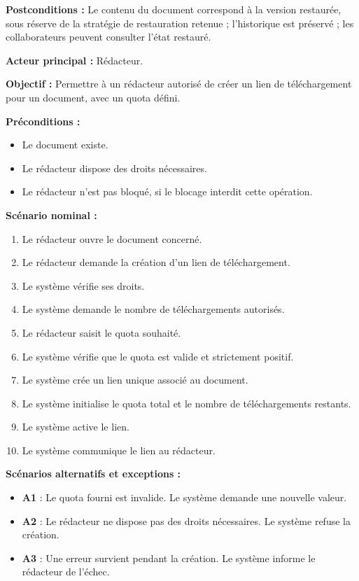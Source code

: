 \begin{description}[leftmargin=0pt, style=nextline, font=\normalfont\bfseries\color{violetprincipal}]
    \textbf{Postconditions :} Le contenu du document correspond à la version restaurée, sous réserve de la stratégie de restauration retenue ; l'historique est préservé ; les collaborateurs peuvent consulter l'état restauré.

    \item[UC07 --- Créer un lien de téléchargement]

    \textbf{Acteur principal :} Rédacteur.

    \textbf{Objectif :} Permettre à un rédacteur autorisé de créer un lien de téléchargement pour un document, avec un quota défini.

    \textbf{Préconditions :}
    \begin{itemize}
        \item Le document existe.
        \item Le rédacteur dispose des droits nécessaires.
        \item Le rédacteur n'est pas bloqué, si le blocage interdit cette opération.
    \end{itemize}

    \textbf{Scénario nominal :}
    \begin{enumerate}
        \item Le rédacteur ouvre le document concerné.
        \item Le rédacteur demande la création d'un lien de téléchargement.
        \item Le système vérifie ses droits.
        \item Le système demande le nombre de téléchargements autorisés.
        \item Le rédacteur saisit le quota souhaité.
        \item Le système vérifie que le quota est valide et strictement positif.
        \item Le système crée un lien unique associé au document.
        \item Le système initialise le quota total et le nombre de téléchargements restants.
        \item Le système active le lien.
        \item Le système communique le lien au rédacteur.
    \end{enumerate}

    \textbf{Scénarios alternatifs et exceptions :}
    \begin{itemize}
        \item \textbf{A1} : Le quota fourni est invalide. Le système demande une nouvelle valeur.
        \item \textbf{A2} : Le rédacteur ne dispose pas des droits nécessaires. Le système refuse la création.
        \item \textbf{A3} : Une erreur survient pendant la création. Le système informe le rédacteur de l'échec.
    \end{itemize}


\end{description}
